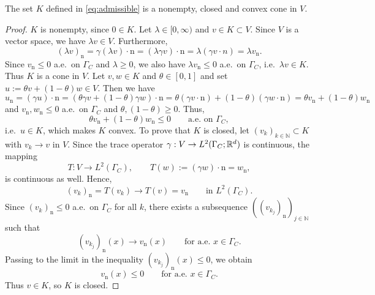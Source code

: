 \begin{proposition}\label{pr:K}
	The set $K$ defined in \ref{eq:admissible} is a nonempty, closed and convex cone in $V$.
\end{proposition}
\begin{proof}
	$K$ is nonempty, since $0\in K$. Let $\lambda\in[0,\infty)$ and $v\in K\subset V$. Since $V$ is a vector space, we have $\lambda v\in V$. Furthermore,
	\begin{equation*}
		(\lambda v)_\mathrm{n} = \gamma(\lambda v)\cdot \mathrm{n} = (\lambda\gamma v)\cdot \mathrm{n} = \lambda(\gamma v\cdot n) = \lambda v_\mathrm{n}.
	\end{equation*}
	Since $v_\mathrm{n}\le 0$ a.e.\ on $\Gamma_C$ and $\lambda\ge 0$, we also have $\lambda v_\mathrm{n}\le 0$ a.e.\ on $\Gamma_C$, i.e.\ $\lambda v\in K$. Thus $K$ is a cone in $V$. Let $v,w\in K$ and $\theta\in[0,1]$ and set $u:= \theta v+(1-\theta)w\in V$. Then we have
	\begin{equation*}
		u_\mathrm{n} =(\gamma u)\cdot \mathrm{n} = (\theta\gamma v+(1-\theta)\gamma w)\cdot \mathrm{n} = \theta(\gamma v\cdot \mathrm{n})+(1-\theta)(\gamma w\cdot\mathrm{n}) = \theta v_\mathrm{n}+(1-\theta)w_\mathrm{n}
	\end{equation*}
	and $v_\mathrm{n},w_\mathrm{n}\le 0$ a.e.\ on $\Gamma_C$ and $\theta,(1-\theta)\ge 0$. Thus,
	\begin{equation*}
		\theta v_\mathrm{n}+(1-\theta)w_\mathrm{n}\le 0\qquad\text{a.e.\ on }\Gamma_C,
	\end{equation*}
	i.e.\ $u\in K$, which makes $K$ convex. To prove that $K$ is closed, let $(v_k)_{k\in\mathbb{N}}\subset K$ with
	$v_k\to v$ in $V$. Since the trace operator $\gamma:V\to L^2(\Gamma_C;{\mathbb R}^d)$
	is continuous, the mapping
	\begin{equation*}
		T:V\to L^2(\Gamma_C),\qquad T(w):=(\gamma w)\cdot \mathrm{n}=w_\mathrm{n},
	\end{equation*}
	is continuous as well. Hence,
	\begin{equation*}
		(v_k)_\mathrm{n}=T(v_k)\to T(v)=v_\mathrm{n}
		\qquad\text{in }L^2(\Gamma_C).
	\end{equation*}
	Since $(v_k)_\mathrm{n}\le 0$ a.e.\ on $\Gamma_C$ for all $k$, there exists a
	subsequence $((v_{k_j})_\mathrm{n})_{j\in\mathbb{N}}$ such that
	\begin{equation*}
		(v_{k_j})_\mathrm{n}(x)\to v_\mathrm{n}(x)
		\qquad\text{for a.e. }x\in\Gamma_C.
	\end{equation*}
	Passing to the limit in the inequality $(v_{k_j})_\mathrm{n}(x)\le 0$, we obtain
	\begin{equation*}
		v_\mathrm{n}(x)\le 0
		\qquad\text{for a.e. }x\in\Gamma_C.
	\end{equation*}
	Thus $v\in K$, so $K$ is closed.
\end{proof}

